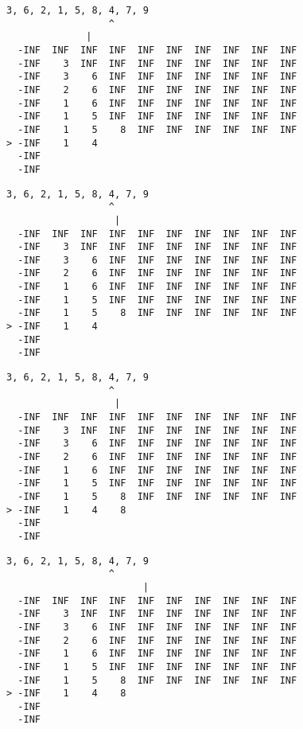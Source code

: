 { \begin{verbatim}
3, 6, 2, 1, 5, 8, 4, 7, 9
                  ^
              |
  -INF  INF  INF  INF  INF  INF  INF  INF  INF  INF
  -INF    3  INF  INF  INF  INF  INF  INF  INF  INF
  -INF    3    6  INF  INF  INF  INF  INF  INF  INF
  -INF    2    6  INF  INF  INF  INF  INF  INF  INF
  -INF    1    6  INF  INF  INF  INF  INF  INF  INF
  -INF    1    5  INF  INF  INF  INF  INF  INF  INF
  -INF    1    5    8  INF  INF  INF  INF  INF  INF
> -INF    1    4                                   
  -INF                                             
  -INF                                             
\end{verbatim} }

{ \begin{verbatim}
3, 6, 2, 1, 5, 8, 4, 7, 9
                  ^
                   |
  -INF  INF  INF  INF  INF  INF  INF  INF  INF  INF
  -INF    3  INF  INF  INF  INF  INF  INF  INF  INF
  -INF    3    6  INF  INF  INF  INF  INF  INF  INF
  -INF    2    6  INF  INF  INF  INF  INF  INF  INF
  -INF    1    6  INF  INF  INF  INF  INF  INF  INF
  -INF    1    5  INF  INF  INF  INF  INF  INF  INF
  -INF    1    5    8  INF  INF  INF  INF  INF  INF
> -INF    1    4                                   
  -INF                                             
  -INF                                             
\end{verbatim} }

{ \begin{verbatim}
3, 6, 2, 1, 5, 8, 4, 7, 9
                  ^
                   |
  -INF  INF  INF  INF  INF  INF  INF  INF  INF  INF
  -INF    3  INF  INF  INF  INF  INF  INF  INF  INF
  -INF    3    6  INF  INF  INF  INF  INF  INF  INF
  -INF    2    6  INF  INF  INF  INF  INF  INF  INF
  -INF    1    6  INF  INF  INF  INF  INF  INF  INF
  -INF    1    5  INF  INF  INF  INF  INF  INF  INF
  -INF    1    5    8  INF  INF  INF  INF  INF  INF
> -INF    1    4    8                              
  -INF                                             
  -INF                                             
\end{verbatim} }

{ \begin{verbatim}
3, 6, 2, 1, 5, 8, 4, 7, 9
                  ^
                        |
  -INF  INF  INF  INF  INF  INF  INF  INF  INF  INF
  -INF    3  INF  INF  INF  INF  INF  INF  INF  INF
  -INF    3    6  INF  INF  INF  INF  INF  INF  INF
  -INF    2    6  INF  INF  INF  INF  INF  INF  INF
  -INF    1    6  INF  INF  INF  INF  INF  INF  INF
  -INF    1    5  INF  INF  INF  INF  INF  INF  INF
  -INF    1    5    8  INF  INF  INF  INF  INF  INF
> -INF    1    4    8                              
  -INF                                             
  -INF                                             
\end{verbatim} }

